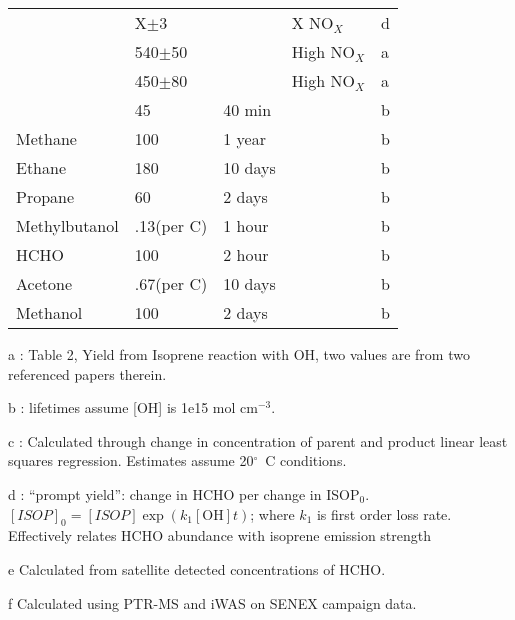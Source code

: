 \begin{table}
\begin{threeparttable}
\begin{tabular}{  l  l  l  l  l  }
      & X$\pm$3         &        & X NO$_X$     & d      \\
      & 540$\pm$50      &        & High NO$_X$  & a     \\
      & 450$\pm$80      &        & High NO$_X$  & a      \\
      & 45              & 40 min &              & b      \\ %
      Methane           & 100             & 1 year  &             & b     \\
      Ethane            & 180             & 10 days &             & b     \\
      Propane           & 60              & 2 days  &             & b     \\
      Methylbutanol     & .13(per C)      & 1 hour  &             & b     \\
      HCHO              & 100             & 2 hour  &             & b     \\
      Acetone           & .67(per C)      & 10 days &             & b     \\
      Methanol          & 100             & 2 days  &             & b     \\ %
      \bottomrule
    \end{tabular}
    \begin{tablenotes} %
      \item a \citet{AtkinsonArey2003}: Table 2, Yield from Isoprene reaction with OH, two values are from two referenced papers therein.
      \item b \citet{Palmer2003}: lifetimes assume [OH] is 1e15 mol cm$^{-3}$.
      \item c \citep{Lee2006}: Calculated through change in concentration of parent and product linear least squares regression.
      Estimates assume 20$^\circ$~C conditions.
      \item d \citet{Wolfe2016}: ``prompt yield'': change in HCHO per change in ISOP$_0$.
      $[ISOP]_0=[ISOP]\exp(k_1[\mathrm{OH}]t)$; where $k_1$ is first order loss rate.
      Effectively relates HCHO abundance with isoprene emission strength
      \item e Calculated from satellite detected concentrations of HCHO.
      \item f Calculated using PTR-MS and iWAS on SENEX campaign data.
    \end{tablenotes}
    \label{ch_isop:tab:VOCLiteratureYields}
\end{threeparttable} \end{table}


